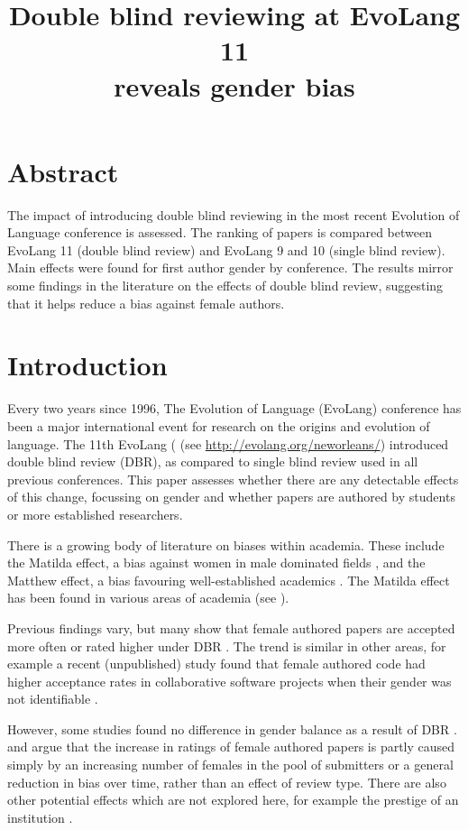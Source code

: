 \documentclass[12pt]{article}
\title{Double blind reviewing at EvoLang 11\\reveals gender bias}
\date{} %
\begin{document}
\maketitle
%


\section*{Abstract}
The impact of introducing double blind reviewing in the most recent Evolution of Language conference is assessed.  The ranking of papers is compared between EvoLang 11 (double blind review) and EvoLang 9 and 10 (single blind review).  Main effects were found for first author gender by conference.  The results mirror some findings in the literature on the effects of double blind review, suggesting that it helps reduce a bias against female authors.

\section{Introduction}

Every two years since 1996, The Evolution of Language (EvoLang) conference has been a major international event for research on the origins and evolution of language.  The 11th EvoLang (\citealp{roberts2016evolution} (see \url{http://evolang.org/neworleans/}) introduced double blind review (DBR), as compared to single blind review used in all previous conferences. This paper assesses whether there are any detectable effects of this change, focussing on gender and whether papers are authored by students or more established researchers.

There is a growing body of literature on biases within academia. These include the Matilda effect, a bias against women in male dominated fields \citep{knobloch2013matilda}, and the Matthew effect, a bias favouring well-established academics \citep{merton1968matthew}.  The Matilda effect has been found in various areas of academia (see \citealp{EU2012meta,Science_WomenInScience}). 

Previous findings vary, but many show that female authored papers are accepted more often or rated higher under DBR \citep{snodgrass2006single,budden2008double}.  The trend is similar in other areas, for example a recent (unpublished) study found that female authored code had higher acceptance rates in collaborative software projects when their gender was not identifiable \citep{terrell2016gender}.  

However, some studies found no difference in gender balance as a result of DBR \citep{primack2009gender,whittaker2008journal}.  \cite{webb2008does} and \cite{engqvist2008double} argue that the increase in ratings of female authored papers is partly caused simply by an increasing number of females in the pool of submitters or a general reduction in bias over time, rather than an effect of review type.  There are also other potential effects which are not explored here, for example the prestige of an institution \citep{blank1991effects}. 
\end{document}
